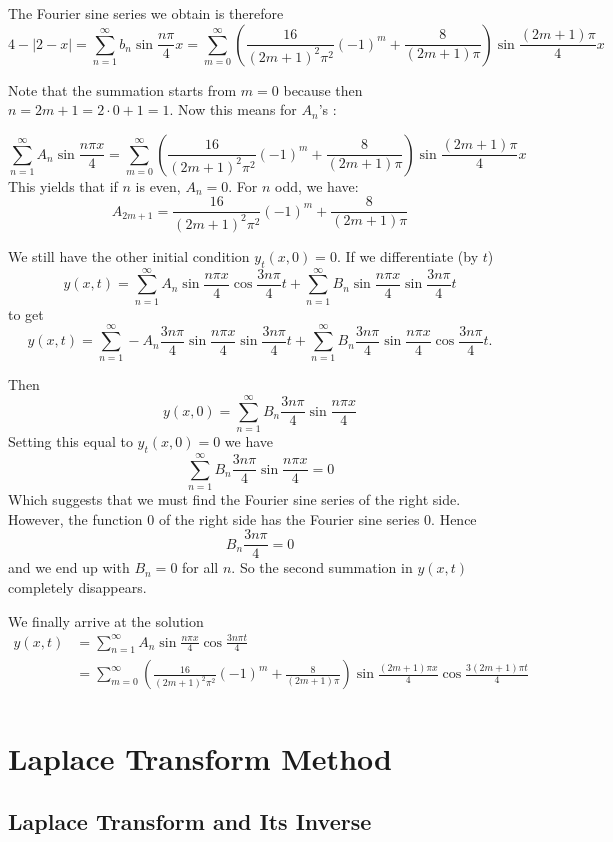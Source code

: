 \documentclass[12pt]{report}
\begin{document}
The Fourier sine series we obtain is therefore
$$ 4 - |2-x| = \sum_{n=1}^{\infty}  b_n \sin \frac{n\pi}{4} x = \sum_{m=0}^{\infty}  \left( \frac{16}{(2m+1)^2\pi^2} (-1)^m + \frac{8}{(2m+1)\pi}  \right) \sin \frac{(2m+1)\pi}{4} x$$

Note that the summation starts from $m=0$ because then $n=2m+1=2\cdot0+1=1$. Now this means for $A_n$'s : 

$$ \sum_{n=1}^{\infty} A_n \sin\frac{n\pi x}{4} = \sum_{m=0}^{\infty}  \left( \frac{16}{(2m+1)^2\pi^2} (-1)^m + \frac{8}{(2m+1)\pi}  \right) \sin \frac{(2m+1)\pi}{4} x$$
This yields that if $n$ is even, $A_n=0$. For $n$ odd, we have:
$$ A_{2m+1} = \frac{16}{(2m+1)^2\pi^2} (-1)^m + \frac{8}{(2m+1)\pi} $$

We still have the other initial condition $ y_t (x,0) = 0$. If we differentiate (by $t$)
$$ y(x,t) = \sum_{n=1}^{\infty} A_n \sin\frac{n\pi x}{4} \cos \frac{3n\pi}{4} t + \sum_{n=1}^{\infty} B_n \sin\frac{n\pi x}{4} \sin \frac{3n\pi}{4} t $$
to get
$$ y(x,t) = \sum_{n=1}^{\infty} -A_n \frac{3n\pi}{4} \sin\frac{n\pi x}{4} \sin \frac{3n\pi}{4} t + \sum_{n=1}^{\infty} B_n \frac{3n\pi}{4}  \sin\frac{n\pi x}{4} \cos \frac{3n\pi}{4} t .$$

Then 
$$y(x,0) = \sum_{n=1}^{\infty} B_n \frac{3n\pi}{4}  \sin\frac{n\pi x}{4} $$
Setting this equal to $ y_t (x,0) = 0$ we have
$$\sum_{n=1}^{\infty} B_n \frac{3n\pi}{4}  \sin\frac{n\pi x}{4} =0$$
Which suggests that we must find the Fourier sine series of the right side. However, the function $0$ of the right side has the Fourier sine series $0$. Hence
$$B_n \frac{3n\pi}{4} =0 $$
and we end up with $B_n=0$ for all $n$. So the second summation in $y(x,t)$ completely disappears.

We finally arrive at the solution
\begin{align*}
y(x,t) &= \sum_{n=1}^{\infty} A_n \sin\frac{n\pi x}{4} \cos \frac{3n\pi t}{4} \\
&= \sum_{m=0}^{\infty}  \left( \frac{16}{(2m+1)^2\pi^2} (-1)^m + \frac{8}{(2m+1)\pi}  \right) \sin \frac{(2m+1)\pi x }{4}  \cos \frac{3(2m+1)\pi t}{4}\\
\end{align*}



\chapter{Laplace Transform Method}

\section{Laplace Transform and Its Inverse}
\end{document}
